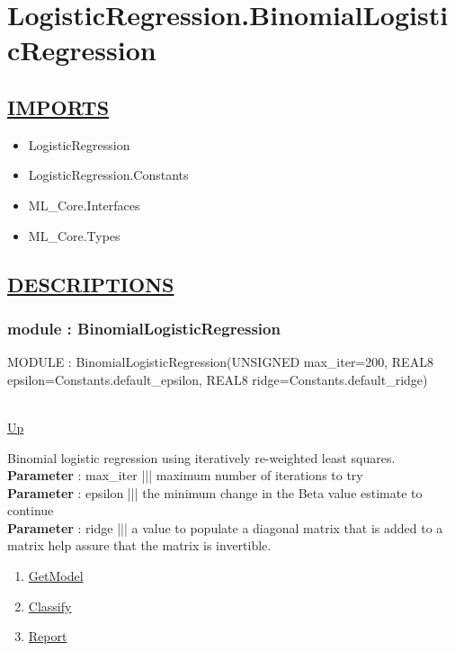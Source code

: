 \chapter*{LogisticRegression.BinomialLogisticRegression}
\hypertarget{LogisticRegression.BinomialLogisticRegression}{}

\section*{\underline{IMPORTS}}
\begin{itemize}
\item LogisticRegression
\item LogisticRegression.Constants
\item ML\_Core.Interfaces
\item ML\_Core.Types
\end{itemize}

\section*{\underline{DESCRIPTIONS}}
\subsection*{module : BinomialLogisticRegression}
\hypertarget{ecldoc:logisticregression.binomiallogisticregression}{MODULE : BinomialLogisticRegression(UNSIGNED max\_iter=200, REAL8 epsilon=Constants.default\_epsilon, REAL8 ridge=Constants.default\_ridge)} \\
\hyperlink{ecldoc:}{Up} \\
\par
Binomial logistic regression using iteratively re-weighted least squares. \\
\textbf{Parameter} : max\_iter ||| maximum number of iterations to try \\
\textbf{Parameter} : epsilon ||| the minimum change in the Beta value estimate to continue \\
\textbf{Parameter} : ridge ||| a value to populate a diagonal matrix that is added to a matrix help assure that the matrix is invertible. \\
\begin{enumerate}
\item \hyperlink{ecldoc:logisticregression.binomiallogisticregression.getmodel}{GetModel}
\item \hyperlink{ecldoc:logisticregression.binomiallogisticregression.classify}{Classify}
\item \hyperlink{ecldoc:logisticregression.binomiallogisticregression.report}{Report}
\end{enumerate}
